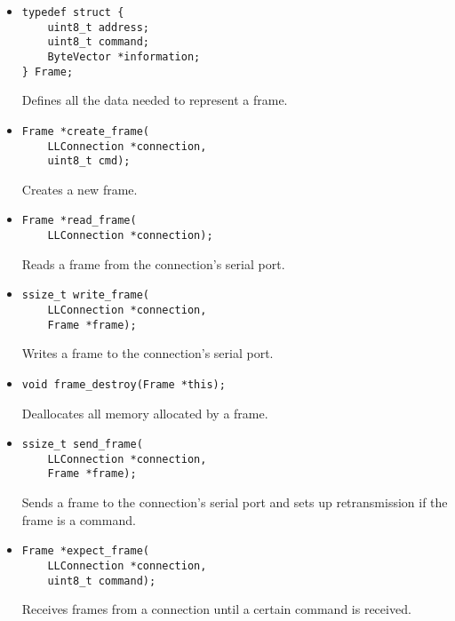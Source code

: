\documentclass[11pt,a4paper,twocolumn]{article}
\begin{document}
\begin{itemize}
    \item \begin{lstlisting}
typedef struct {
    uint8_t address;
    uint8_t command;
    ByteVector *information;
} Frame;
    \end{lstlisting}

          Defines all the data needed to represent a frame.

    \item \begin{lstlisting}
Frame *create_frame(
    LLConnection *connection, 
    uint8_t cmd);
    \end{lstlisting}

          Creates a new frame.

    \item \begin{lstlisting}
Frame *read_frame(
    LLConnection *connection);
    \end{lstlisting}

          Reads a frame from the connection's serial port.

    \item \begin{lstlisting}
ssize_t write_frame(
    LLConnection *connection, 
    Frame *frame);
    \end{lstlisting}

          Writes a frame to the connection's serial port.

    \item \begin{lstlisting}
void frame_destroy(Frame *this);
    \end{lstlisting}

          Deallocates all memory allocated by a frame.

    \item \begin{lstlisting}
ssize_t send_frame(
    LLConnection *connection, 
    Frame *frame);
    \end{lstlisting}

          Sends a frame to the connection's serial port and sets up retransmission if the frame is a command.

    \item \begin{lstlisting}
Frame *expect_frame(
    LLConnection *connection, 
    uint8_t command);
    \end{lstlisting}

          Receives frames from a connection until a certain command is received.

\end{itemize}
\end{document}
